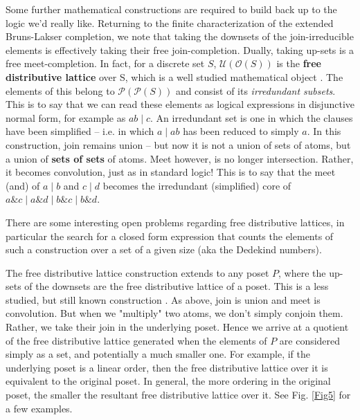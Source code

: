\documentclass[hoptionsi,review,format=acmsmall]{acmart}
\theoremstyle{definition}
\newcommand{\Oc}{\mathcal{O}}
\newcommand{\Pc}{\mathcal{P}}
\newcommand{\Ucc}{\mathcal{U}}
\newcommand{\band}{\mathbin{\&}}
\newcommand{\bor}{\mathbin{|}}
\begin{document}
Some further mathematical constructions are required to build back up to the logic we'd really like. Returning to the finite characterization of the extended Bruns-Lakser completion, we note that taking the downsets of the join-irreducible elements is effectively taking their free join-completion. Dually, taking up-sets is a free meet-completion. In fact, for a discrete set \(S\), \(\Ucc(\Oc(S))\) is the \textbf{free distributive lattice} over S, which is a well studied mathematical object \cite{gratzer2009lattice}. The elements of this belong to \(\Pc(\Pc(S))\) and consist of its \textit{irredundant subsets}. This is to say that we can read these elements as logical expressions in disjunctive normal form, for example as \(ab \bor c\). An irredundant set is one in which the clauses have been simplified -- i.e. in which \(a \bor ab\) has been reduced to simply \(a\).  In this construction, join remains union -- but now it is not a union of sets of atoms, but a union of \textbf{sets of sets} of atoms. Meet however, is no longer intersection. Rather, it becomes convolution, just as in standard logic! This is to say that the meet (and) of \(a \bor b\) and \(c \bor d\) becomes the irredundant (simplified) core of \(a \band c \bor a \band d \bor b \band c \bor b \band d\).

There are some interesting open problems regarding free distributive lattices, in particular the search for a closed form expression that counts the elements of such a construction over a set of a given size (aka the Dedekind numbers).

The free distributive lattice construction extends to any poset \(P\), where the up-sets of the downsets are the free distributive lattice of a poset. This is a less studied, but still known construction \cite{johnstone1982stone}. As above, join is union and meet is convolution. But when we "multiply" two atoms, we don't simply conjoin them. Rather, we take their join in the underlying poset. Hence we arrive at a quotient of the free distributive lattice generated when the elements of \(P\) are considered simply as a set, and potentially a much smaller one. For example, if the underlying poset is a linear order, then the free distributive lattice over it is equivalent to the original poset. In general, the more ordering in the original poset, the smaller the resultant free distributive lattice over it. See Fig. \ref{Fig5} for a few examples.
\end{document}
